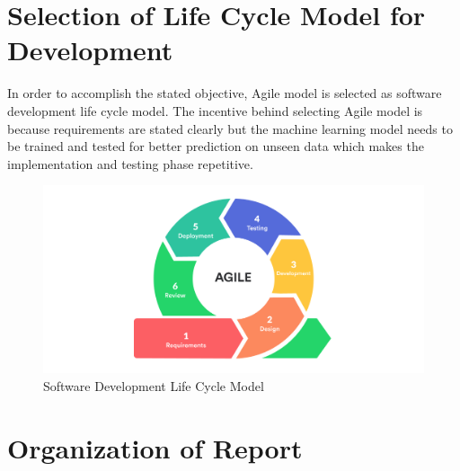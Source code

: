 \section{Selection of Life Cycle Model for Development}

In order to accomplish the stated objective, Agile model is selected as software development life cycle model. The incentive behind selecting Agile model is because requirements
are stated clearly but the machine learning model needs to be trained and tested for better prediction on unseen data which makes the implementation and testing phase repetitive.
\begin{figure}[!ht]
\centering
        \includegraphics[totalheight=8cm]{Introduction/AgileModel.png}
    \caption{Software Development Life Cycle Model}
    \label{fig:verticalcell}
\end{figure}


\section{Organization of Report}

